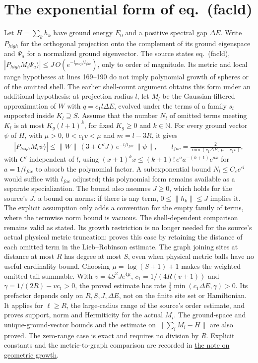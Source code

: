 \documentclass{article}
\begin{document}
\section{The exponential form of eq.~(facld)}
Let $H=\sum_k h_k$ have ground energy $E_0$ and a positive spectral gap
$\Delta E$. Write $P_{high}$ for the orthogonal projection onto the complement
of its ground eigenspace and $\Psi_a$ for a normalized ground eigenvector.
The source states eq.~(facld), $|P_{high}M_i\Psi_a\rangle|\le
J\,O(e^{-l_{proj}/l_{fac}})$, only to order of magnitude. Its metric and local
range hypotheses at lines 169--190 do not imply polynomial growth of spheres
or of the omitted shell. The earlier shell-count argument obtains this form
under an additional hypothesis: at projection radius $l$, let $M_l$ be the
Gaussian-filtered approximation of $W$ with $q=c_1l\Delta E$, evolved under
the terms of a family $s_l$ supported inside $K_l\supseteq S$. Assume that
the number $N_l$ of omitted terms meeting $K_l$ is at most $K_g(l+1)^k$, for
fixed $K_g\ge0$ and $k\in\mathbb N$. For every ground vector $\psi$ of $H$,
with $\mu>0$, $0<c_1v<\mu$ and $m=l-3R$, it gives
\begin{align}
  |P_{high}M_l\psi\rangle|\le\|W\|\,(3+C'J)\,e^{-l/l_{fac}}\,\|\psi\|,
  \qquad
  l_{fac}=\frac{2}{\min(c_1\Delta E,\ \mu-c_1v)},
  \label{eq:hastings05_truncated_dynamics_facld_decay}
\end{align}
with $C'$ independent of $l$, using $(x+1)^kx\le(k+1)!\,e^{a}a^{-(k+1)}e^{ax}$
for $a=1/l_{fac}$ to absorb the polynomial factor. A subexponential bound
$N_l\le C_\varepsilon e^{\varepsilon l}$ would suffice with $l_{fac}$ adjusted;
this polynomial form remains available as a separate specialization. The bound also assumes $J\ge0$,
which holds for the source's $J$, a bound on norms: if there is any term,
$0\le\|h_k\|\le J$ implies it. The explicit assumption only adds a convention
for the empty family of terms, where the termwise norm bound is vacuous.
The shell-dependent comparison remains valid as stated. Its growth restriction
is no longer needed for the source's actual physical metric truncation:
 proves this case by retaining the
distance of each omitted term in the Lieb--Robinson estimate. The graph
joining sites at distance at most $R$ has degree at most $S$, even when physical
metric balls have no useful cardinality bound. Choosing
$\mu=\log(S+1)+1$ makes the weighted omitted tail summable. With
$v=4S^2Je^{4\mu}$, $c_1=1/(4R(v+1))$ and
$\gamma=1/(2R)-vc_1>0$, the proved estimate has rate
$\tfrac12\min(c_1\Delta E,\gamma)>0$. Its prefactor depends only on
$R,S,J,\Delta E$, not on the finite site set or Hamiltonian. It applies for
$\ell\ge R$, the large-radius range of the source's order estimate, and
proves support, norm and Hermiticity for the actual $M_i$. The ground-space
and unique-ground-vector bounds and the estimate on $\|\sum_iM_i-H\|$ are
also proved. The zero-range case is exact and requires no division by $R$.
Explicit constants and the metric-to-graph comparison are recorded in
\href{https://sirui-lu.com/QICLean/paper-gaps/hastings05_geometric_growth_scope.pdf}
{the note on geometric growth}.
\end{document}
